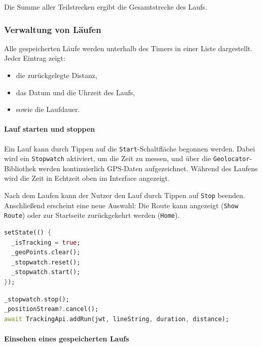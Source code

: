 \documentclass[11pt,a4paper]{article}
\begin{document}
Die Summe aller Teilstrecken ergibt die Gesamtstrecke des Laufs.

\subsubsection{Verwaltung von Läufen}

Alle gespeicherten Läufe werden unterhalb des Timers in einer Liste dargestellt. Jeder Eintrag zeigt:

\begin{itemize}
  \item die zurückgelegte Distanz,
  \item das Datum und die Uhrzeit des Laufs,
  \item sowie die Laufdauer.
\end{itemize}

\paragraph{Lauf starten und stoppen}

Ein Lauf kann durch Tippen auf die \texttt{Start}-Schaltfläche begonnen werden. Dabei wird ein \texttt{Stopwatch} aktiviert, um die Zeit zu messen, und über die \texttt{Geolocator}-Bibliothek werden kontinuierlich GPS-Daten aufgezeichnet. Während des Laufens wird die Zeit in Echtzeit oben im Interface angezeigt.

Nach dem Laufen kann der Nutzer den Lauf durch Tippen auf \texttt{Stop} beenden. Anschließend erscheint eine neue Auswahl: Die Route kann angezeigt (\texttt{Show Route}) oder zur Startseite zurückgekehrt werden (\texttt{Home}).

\begin{lstlisting}[language=Dart, caption=Starten des Trackings]
setState(() {
  _isTracking = true;
  _geoPoints.clear();
  _stopwatch.reset();
  _stopwatch.start();
});
\end{lstlisting}

\begin{lstlisting}[language=Dart, caption=Stoppen des Trackings und Speichern]
_stopwatch.stop();
_positionStream?.cancel();
await TrackingApi.addRun(jwt, lineString, duration, distance);
\end{lstlisting}

\paragraph{Einsehen eines gespeicherten Laufs}
\end{document}
